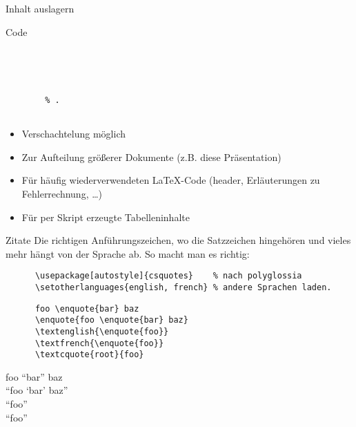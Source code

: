 \begin{frame}[fragile]{Inhalt auslagern}
  \begin{tblock}{Code}
    \begin{lstlisting}
      
      
        
        
        % .
      
    \end{lstlisting}
  \end{tblock}
  \begin{itemize}
    \item Verschachtelung möglich
    \item Zur Aufteilung größerer Dokumente (z.B. diese Präsentation)
    \item Für häufig wiederverwendeten \LaTeX-Code (header, Erläuterungen zu Fehlerrechnung, …)
    \item Für per Skript erzeugte Tabelleninhalte
  \end{itemize}
\end{frame}

\begin{frame}[fragile]{Zitate}
  Die richtigen Anführungszeichen, wo die Satzzeichen hingehören und vieles mehr hängt von der Sprache ab.
  So macht man es richtig:
  \begin{Packages}
    \begin{lstlisting}
      \usepackage[autostyle]{csquotes}    % nach polyglossia
      \setotherlanguages{english, french} % andere Sprachen laden.
    \end{lstlisting}
  \end{Packages}
  \begin{CodeExample}{0.60}
    \begin{lstlisting}
      foo \enquote{bar} baz
      \enquote{foo \enquote{bar} baz}
      \textenglish{\enquote{foo}}
      \textfrench{\enquote{foo}}
      \textcquote{root}{foo}
    \end{lstlisting}
  \CodeResult
    foo \enquote{bar} baz \\
    \enquote{foo \enquote{bar} baz} \\
    \textenglish{\enquote{foo}} \\
    \textfrench{ \enquote{foo}} \\
  \end{CodeExample}
\end{frame}
